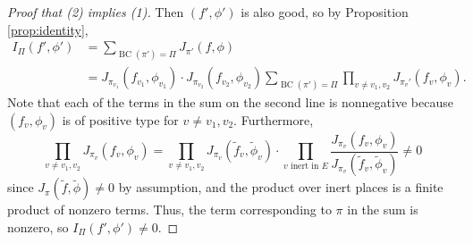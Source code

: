 \documentclass[11pt, reqno]{amsart}
\numberwithin{equation}{subsection}
\theoremstyle{plain}
\theoremstyle{definition}
\newcommand{\wt}{\widetilde}
\begin{document}
\begin{proof}[Proof that (2) implies (1)]
Then $(f', \phi')$ is also good, so by
Proposition \ref{prop:identity}, 
\begin{align*}
    I_\Pi(f', \phi') 
    &= \sum_{\operatorname{BC}(\pi') = \Pi} J_{\pi'}(f, \phi) 
    \\&= 
    J_{\pi_{v_1}}(f_{v_1},\phi_{v_1})\cdot
    J_{\pi_{v_2}}(f_{v_2}, \phi_{v_2})
    \sum_{\operatorname{BC}(\pi') = \Pi}
    \prod_{v \ne v_1, v_2}
    J_{\pi_v'}(f_v, \phi_v).
\end{align*}
Note that each of the terms in the
sum on the second line is nonnegative because 
$(f_v, \phi_v)$ is of
positive type for $v \neq v_1, v_2$.
Furthermore,
\[
    \prod_{v \neq v_1, v_2} J_{\pi_v}(f_v, \phi_v)
    = \prod_{v \neq v_1, v_2}
    J_{\pi_v}(\wt f_v, \wt \phi_v) \cdot 
    \prod_{v \text{ inert in } E}
    \frac{J_{\pi_v}(f_v, \phi_v)}
    {J_{\pi_v}(\wt f_v, \wt\phi_v)} \neq 0
\]
since $J_{\pi}(\wt f, \wt \phi) \neq 0$ by assumption,
and the product over inert places is a finite
product of nonzero terms.
Thus, the term corresponding to $\pi$ in the sum is
nonzero, so $I_{\Pi}(f', \phi') \neq 0$.
\end{proof}
\end{document}
